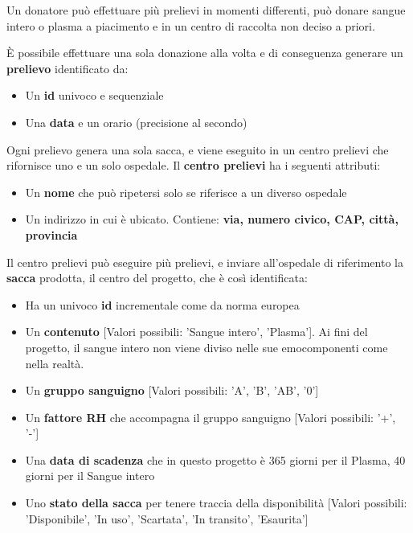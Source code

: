 \documentclass[10pt, a4paper]{article}
\begin{document}
Un donatore può effettuare più prelievi in momenti differenti, può donare sangue intero o plasma a piacimento e in un centro di raccolta non deciso a priori. 

È possibile effettuare una sola donazione alla volta e di conseguenza generare un \textbf{prelievo} identificato da:

\begin{itemize}
    \item Un \textbf{id} univoco e sequenziale
    \item Una \textbf{data} e un orario (precisione al secondo)
\end{itemize}

Ogni prelievo genera una sola sacca, e viene eseguito in un centro prelievi che rifornisce uno e un solo ospedale. Il \textbf{centro prelievi} ha i seguenti attributi:

\begin{itemize}
    \item Un \textbf{nome} che può ripetersi solo se riferisce a un diverso ospedale
    \item Un indirizzo in cui è ubicato. Contiene: \textbf{via, numero civico, CAP, città, provincia}
\end{itemize}

Il centro prelievi può eseguire più prelievi, e inviare all'ospedale di riferimento la \textbf{sacca} prodotta, il centro del progetto, che è così identificata:

\begin{itemize}
    \item Ha un univoco \textbf{id} incrementale come da norma europea
    \item Un \textbf{contenuto} [Valori possibili: 'Sangue intero', 'Plasma']. Ai fini del progetto, il sangue intero non viene diviso nelle sue emocomponenti come nella realtà.
    \item Un \textbf{gruppo sanguigno} [Valori possibili: 'A', 'B', 'AB', '0']
    \item Un \textbf{fattore RH} che accompagna il gruppo sanguigno [Valori possibili: '+', '-']
    \item Una \textbf{data di scadenza} che in questo progetto è 365 giorni per il Plasma, 40 giorni per il Sangue intero
    \item Uno \textbf{stato della sacca} per tenere traccia della disponibilità [Valori possibili: 'Disponibile', 'In uso', 'Scartata', 'In transito', 'Esaurita']
\end{itemize}
\end{document}
